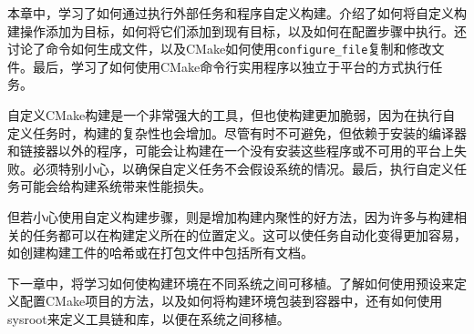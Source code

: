 本章中，学习了如何通过执行外部任务和程序自定义构建。介绍了如何将自定义构建操作添加为目标，如何将它们添加到现有目标，以及如何在配置步骤中执行。还讨论了命令如何生成文件，以及CMake如何使用\texttt{configure\_file}复制和修改文件。最后，学习了如何使用CMake命令行实用程序以独立于平台的方式执行任务。

自定义CMake构建是一个非常强大的工具，但也使构建更加脆弱，因为在执行自定义任务时，构建的复杂性也会增加。尽管有时不可避免，但依赖于安装的编译器和链接器以外的程序，可能会让构建在一个没有安装这些程序或不可用的平台上失败。必须特别小心，以确保自定义任务不会假设系统的情况。最后，执行自定义任务可能会给构建系统带来性能损失。

但若小心使用自定义构建步骤，则是增加构建内聚性的好方法，因为许多与构建相关的任务都可以在构建定义所在的位置定义。这可以使任务自动化变得更加容易，如创建构建工件的哈希或在打包文件中包括所有文档。

下一章中，将学习如何使构建环境在不同系统之间可移植。了解如何使用预设来定义配置CMake项目的方法，以及如何将构建环境包装到容器中，还有如何使用sysroot来定义工具链和库，以便在系统之间移植。